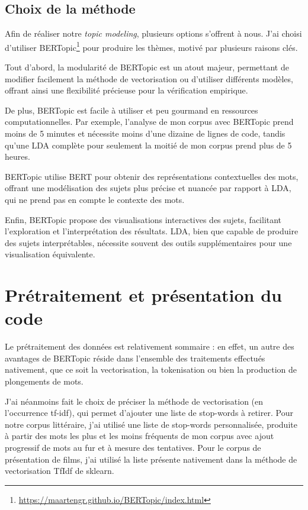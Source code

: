\documentclass[a4paper,12pt,onecolumn,oneside]{article}
\begin{document}
\subsection{Choix de la méthode}
Afin de réaliser notre \emph{topic modeling}, plusieurs options s'offrent à nous. J'ai choisi d'utiliser BERTopic\footnote{\url{https://maartengr.github.io/BERTopic/index.html}} pour produire les thèmes, motivé par plusieurs raisons clés.

Tout d'abord, la modularité de BERTopic est un atout majeur, permettant de modifier facilement la méthode de vectorisation ou d'utiliser différents modèles, offrant ainsi une flexibilité précieuse pour la vérification empirique.

De plus, BERTopic est facile à utiliser et peu gourmand en ressources computationnelles. Par exemple, l'analyse de mon corpus avec BERTopic prend moins de 5 minutes et nécessite moins d'une dizaine de lignes de code, tandis qu'une LDA complète pour seulement la moitié de mon corpus prend plus de 5 heures.

BERTopic utilise BERT pour obtenir des représentations contextuelles des mots, offrant une modélisation des sujets plus précise et nuancée par rapport à LDA, qui ne prend pas en compte le contexte des mots.

Enfin, BERTopic propose des visualisations interactives des sujets, facilitant l'exploration et l'interprétation des résultats. LDA, bien que capable de produire des sujets interprétables, nécessite souvent des outils supplémentaires pour une visualisation équivalente.

\section{Prétraitement et présentation du code}
Le prétraitement des données est relativement sommaire : en effet, un autre des avantages de BERTopic réside dans l'ensemble des traitements effectués nativement, que ce soit la vectorisation, la tokenisation ou bien la production de plongements de mots.

J'ai néanmoins fait le choix de préciser la méthode de vectorisation (en l'occurrence tf-idf), qui permet d'ajouter une liste de stop-words à retirer. 
Pour notre corpus littéraire, j'ai utilisé une liste de stop-words personnalisée, produite à partir des mots les plus et les moins fréquents de mon corpus avec ajout progressif de mots au fur et à mesure des tentatives. 
Pour le corpus de présentation de films, j'ai utilisé la liste présente nativement dans la méthode de vectorisation TfIdf de sklearn.
\end{document}
